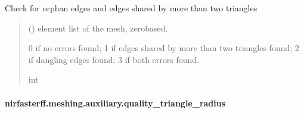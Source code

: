 \documentclass[letterpaper,10pt,english]{sphinxmanual}
\begin{document}
\begin{fulllineitems}
\label{\detokenize{_autosummary/nirfasterff.meshing.auxiliary.checkedges:nirfasterff.meshing.auxiliary.checkedges}}
\pysigstartsignatures
\pysiglinewithargsret
{}
{}
{}
\pysigstopsignatures
\sphinxAtStartPar
Check for orphan edges and edges shared by more than two triangles
\begin{quote}\begin{description}
\sphinxAtStartPar
{} () \textendash{} element list of the mesh, zero\sphinxhyphen{}based.

\sphinxAtStartPar
{} \textendash{} 0 if no errors found; 1 if edges shared by more than two triangles found; 2 if dangling edges found; 3 if both errors found.

\sphinxAtStartPar
int

\end{description}\end{quote}

\end{fulllineitems}


\sphinxstepscope


\paragraph{nirfasterff.meshing.auxiliary.quality\_triangle\_radius}
\label{\detokenize{_autosummary/nirfasterff.meshing.auxiliary.quality_triangle_radius:nirfasterff-meshing-auxiliary-quality-triangle-radius}}\label{\detokenize{_autosummary/nirfasterff.meshing.auxiliary.quality_triangle_radius::doc}}
\end{document}
